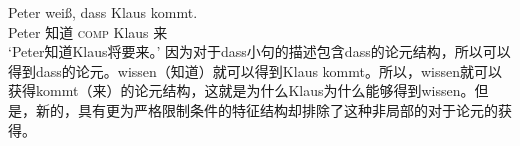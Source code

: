 \ea
\gll Peter weiß, dass Klaus kommt.\\
	 Peter 知道 \textsc{comp} Klaus 来\\
\glt `Peter知道Klaus将要来。'
\z
因为对于dass小句的描述包含dass的论元结构，所以可以得到dass的论元。wissen（知道）就可以得到Klaus kommt。所以，wissen就可以获得kommt（来）的论元结构，这就是为什么Klaus为什么能够得到wissen。但是，新的，具有更为严格限制条件的特征结构却排除了这种非局部的对于论元的获得。

